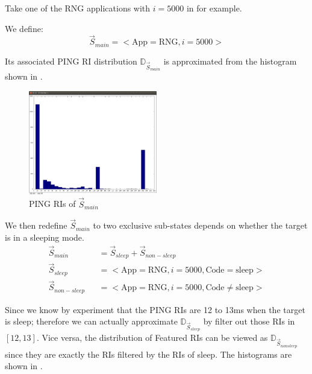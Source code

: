 \begin{example}
Take one of the RNG applications with $i = 5000$ in  for example. 

We define:
\begin{equation*}
\vec{S}_{main} = <\text{App}=\text{RNG}, i=5000>
\end{equation*}

Its associated PING RI distribution $\mathbb{D}_{\vec{S}_{main}}$ is approximated from the histogram shown in .

\begin{figure}
\center
\includegraphics[width=0.5\textwidth]{fig/D_S.png}
\caption{PING RIs of $\vec{S}_{main}$}
\label{Fig: s_main}
\end{figure}

We then redefine $\vec{S}_{main}$ to two exclusive sub-states depends on whether the target is in a sleeping mode.
\begin{eqnarray*}
\vec{S}_{main} &&= \vec{S}_{sleep} + \vec{S}_{non-sleep} \\
\vec{S}_{sleep} &&= <\text{App} = \text{RNG}, i = 5000, \text{Code} = \text{sleep}> \\
\vec{S}_{non-sleep} &&= <\text{App} = \text{RNG}, i = 5000, \text{Code} \neq \text{sleep}>
\end{eqnarray*}

Since we know by experiment that the PING RIs are 12 to 13ms when the target is sleep; therefore we can actually approximate $\mathbb{D}_{\vec{S}_{sleep}}$ by filter out those RIs in $[12,13]$. Vice versa,  the distribution of Featured RIs can be viewed as $\mathbb{D}_{\vec{S}_{nonsleep}}$ since they are exactly the RIs filtered by the RIs of sleep. The histograms are shown in .


\end{example}
